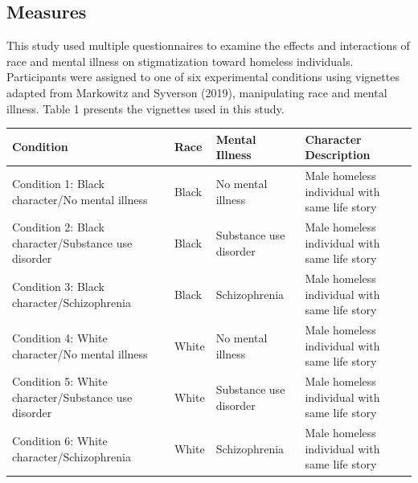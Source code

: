 \documentclass[
  man,
  floatsintext,
  longtable,
  nolmodern,
  notxfonts,
  notimes,
  colorlinks=true,linkcolor=blue,citecolor=blue,urlcolor=blue]{apa7}
\begin{document}
\subsection{Measures}\label{measures}

This study used multiple questionnaires to examine the effects and
interactions of race and mental illness on stigmatization toward
homeless individuals. Participants were assigned to one of six
experimental conditions using vignettes adapted from Markowitz and
Syverson (2019), manipulating race and mental illness. Table 1 presents
the vignettes used in this study.

\begin{table}

{\caption{{Experimental conditions}{\label{tbl-mytable2}}}
\vspace{-20pt}}

\begin{longtable}[]{@{}
  >{\raggedright\arraybackslash}p{}
  >{\raggedright\arraybackslash}p{}
  >{\raggedright\arraybackslash}p{}
  >{\raggedright\arraybackslash}p{}@{}}
\toprule\noalign{}
\begin{minipage}[b]{\linewidth}\raggedright
\textbf{Condition}
\end{minipage} & \begin{minipage}[b]{\linewidth}\raggedright
\textbf{Race}
\end{minipage} & \begin{minipage}[b]{\linewidth}\raggedright
\textbf{Mental Illness}
\end{minipage} & \begin{minipage}[b]{\linewidth}\raggedright
\textbf{Character Description}
\end{minipage} \\
\midrule\noalign{}
\endhead
\bottomrule\noalign{}
\endlastfoot
Condition 1: Black character/No mental illness & Black & No mental
illness & Male homeless individual with same life story \\
Condition 2: Black character/Substance use disorder & Black & Substance
use disorder & Male homeless individual with same life story \\
Condition 3: Black character/Schizophrenia & Black & Schizophrenia &
Male homeless individual with same life story \\
Condition 4: White character/No mental illness & White & No mental
illness & Male homeless individual with same life story \\
Condition 5: White character/Substance use disorder & White & Substance
use disorder & Male homeless individual with same life story \\
Condition 6: White character/Schizophrenia & White & Schizophrenia &
Male homeless individual with same life story \\
\end{longtable}


\end{table}
\end{document}
